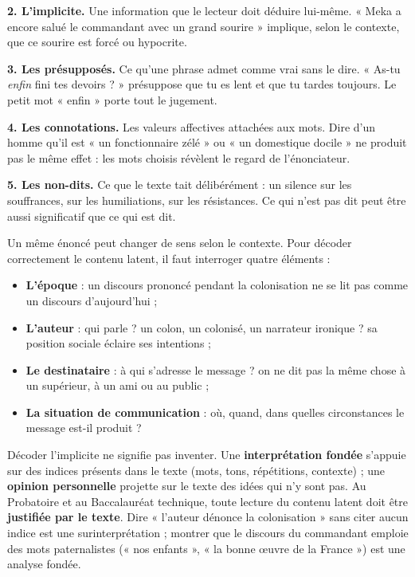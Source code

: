 \documentclass[11pt]{article}
\newcommand{\cle}[1]{{\popxbold\color{popdark}#1}}
\newcounter{popsec}
\newcounter{popsub}
\newcommand{\courssub}[1]{%
  \stepcounter{popsub}%
  \par\vspace{9pt}\noindent{\popxbold\fontsize{11.5}{13}\selectfont\color{popink}{\color{poporange}\thepopsec.\thepopsub}\hspace{6pt}#1}\par\nopagebreak\vspace{4pt}
}
\begin{document}
\textbf{2. L'implicite.} Une information que le lecteur doit déduire lui-même. « Meka a encore salué le commandant avec un grand sourire » implique, selon le contexte, que ce sourire est forcé ou hypocrite.

\textbf{3. Les présupposés.} Ce qu'une phrase admet comme vrai sans le dire. « As-tu \emph{enfin} fini tes devoirs ? » présuppose que tu es lent et que tu tardes toujours. Le petit mot « enfin » porte tout le jugement.

\textbf{4. Les connotations.} Les valeurs affectives attachées aux mots. Dire d'un homme qu'il est « un fonctionnaire zélé » ou « un domestique docile » ne produit pas le même effet : les mots choisis révèlent le regard de l'énonciateur.

\textbf{5. Les non-dits.} Ce que le texte tait délibérément : un silence sur les souffrances, sur les humiliations, sur les résistances. Ce qui n'est pas dit peut être aussi significatif que ce qui est dit.

\courssub{Le rôle du contexte}

Un même énoncé peut changer de sens selon le \cle{contexte}. Pour décoder correctement le contenu latent, il faut interroger quatre éléments :

\begin{itemize}
\item \textbf{L'époque} : un discours prononcé pendant la colonisation ne se lit pas comme un discours d'aujourd'hui ;
\item \textbf{L'auteur} : qui parle ? un colon, un colonisé, un narrateur ironique ? sa position sociale éclaire ses intentions ;
\item \textbf{Le destinataire} : à qui s'adresse le message ? on ne dit pas la même chose à un supérieur, à un ami ou au public ;
\item \textbf{La situation de communication} : où, quand, dans quelles circonstances le message est-il produit ?
\end{itemize}

\begin{attention}
Décoder l'implicite ne signifie pas inventer. Une \textbf{interprétation fondée} s'appuie sur des indices présents dans le texte (mots, tons, répétitions, contexte) ; une \textbf{opinion personnelle} projette sur le texte des idées qui n'y sont pas. Au Probatoire et au Baccalauréat technique, toute lecture du contenu latent doit être \textbf{justifiée par le texte}. Dire « l'auteur dénonce la colonisation » sans citer aucun indice est une surinterprétation ; montrer que le discours du commandant emploie des mots paternalistes (« nos enfants », « la bonne œuvre de la France ») est une analyse fondée.
\end{attention}
\end{document}
